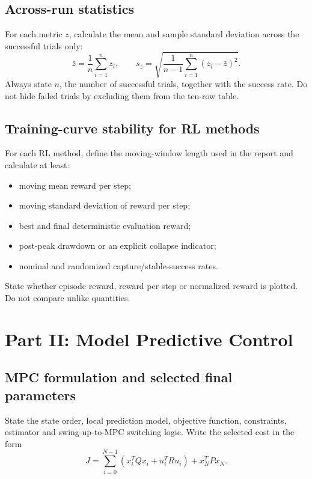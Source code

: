 \documentclass[11pt,a4paper]{article}
\begin{document}
\subsection{Across-run statistics}

For each metric $z$, calculate the mean and sample standard deviation across the
successful trials only:
\begin{equation}
\bar z=\frac{1}{n}\sum_{i=1}^{n}z_i,
\qquad
s_z=\sqrt{\frac{1}{n-1}\sum_{i=1}^{n}(z_i-\bar z)^2}.
\end{equation}
Always state $n$, the number of successful trials, together with the success
rate. Do not hide failed trials by excluding them from the ten-row table.

\subsection{Training-curve stability for RL methods}

For each RL method, define the moving-window length used in the report and
calculate at least:
\begin{itemize}
  \item moving mean reward per step;
  \item moving standard deviation of reward per step;
  \item best and final deterministic evaluation reward;
  \item post-peak drawdown or an explicit collapse indicator;
  \item nominal and randomized capture/stable-success rates.
\end{itemize}
State whether episode reward, reward per step or normalized reward is plotted.
Do not compare unlike quantities.

\section{Part II: Model Predictive Control}
\label{sec:mpc}

\subsection{MPC formulation and selected final parameters}

State the state order, local prediction model, objective function, constraints,
estimator and swing-up-to-MPC switching logic. Write the selected cost in the
form
\begin{equation}
J=\sum_{i=0}^{N-1}\left(x_i^TQx_i+u_i^TRu_i\right)+x_N^TPx_N.
\end{equation}
\end{document}
